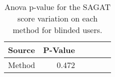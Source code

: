 
\begin{table}[!htb]
\centering
\caption{Anova p-value for the SAGAT score variation on each method for blinded users.}
\label{tab:blocanova_sagat_var_blind}
\begin{tabular}{lrrrrr}
\toprule
Source & P-Value \\
\midrule
Method &   0.472 \\
\bottomrule
\end{tabular}
\end{table}

